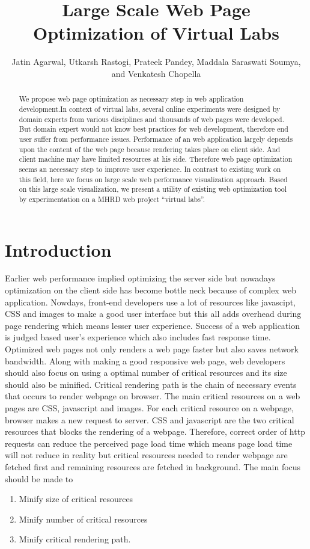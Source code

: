 \documentclass[a4paper,10pt]{IEEEtran}
\title{Large Scale Web Page Optimization of Virtual Labs}
\author{Jatin Agarwal, Utkarsh Rastogi, Prateek Pandey, Maddala Saraswati Soumya, 
and Venkatesh Chopella}
\begin{document}
\maketitle

\begin{abstract}
We propose web page optimization as necessary step in web application
development.In context of virtual labs, several online experiments were designed by domain
experts
from various disciplines and thousands of web pages were developed.
But domain expert would not know best practices for web development, therefore
end user suffer from performance issues.
Performance of an web application largely depends upon the content of the web
page because rendering takes place on client side. 
And client machine may have limited resources at his side. Therefore web page
optimization seems an necessary step to improve user experience.
In contrast to existing work on this field, here we focus on large scale web
performance visualization approach. Based on this large scale visualization,
we present a utility of existing web optimization tool by experimentation on a
MHRD web project ``virtual labs''.
\end{abstract}

\section{Introduction}\label{sec-2}
Earlier web performance implied optimizing the server side but nowadays
optimization on the client side has become bottle neck because of complex web
application. Nowdays, front-end developers use a lot of resources like
javascipt, CSS and images to make a good user interface but this all adds
overhead
during page rendering which means lesser user experience. Success of a web
application is judged based user's experience which also includes fast response
time.
Optimized web pages not only renders a web page faster but also saves network
bandwidth. Along with making a good responsive web page, web developers should
also focus on using a optimal number of critical resources and its size should
also be minified. Critical rendering path is the chain of necessary events that
occurs to render webpage on browser. The main critical resources on a web
pages are CSS, javascript and images. For each critical resource on a
webpage, browser makes a new request to server. CSS and javascript are the two
critical resources that blocks the rendering of a webpage. Therefore, correct
order of http requests can reduce the perceived page load time which means page
load time will not reduce in reality but critical resources needed to render webpage are
fetched first and remaining resources are fetched in background. The main focus
should be made to
\begin{enumerate}
 \item Minify size of critical resources
 \item Minify number of critical resources
 \item Minify critical rendering path.
\end{enumerate}
\end{document}
